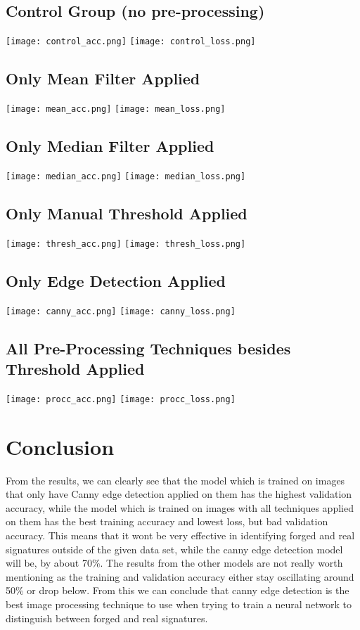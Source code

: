 \documentclass[conference]{IEEEtran}
\begin{document}
\subsection{Control Group (no pre-processing)}

\texttt{[image: control\_acc.png]}
\texttt{[image: control\_loss.png]}
\newpage

\subsection{Only Mean Filter Applied}
\texttt{[image: mean\_acc.png]}
\texttt{[image: mean\_loss.png]}

\subsection{Only Median Filter Applied}
\texttt{[image: median\_acc.png]}
\texttt{[image: median\_loss.png]}

\subsection{Only Manual Threshold Applied}
\texttt{[image: thresh\_acc.png]}
\texttt{[image: thresh\_loss.png]}

\subsection{Only Edge Detection Applied}
\texttt{[image: canny\_acc.png]}
\texttt{[image: canny\_loss.png]}

\subsection{All Pre-Processing Techniques besides Threshold Applied}
\texttt{[image: procc\_acc.png]}
\texttt{[image: procc\_loss.png]}



\section{Conclusion}
From the results, we can clearly see that the model which is trained on images that only have Canny edge detection applied on them has the highest validation accuracy, while the model which is trained on images with all techniques applied on them has the best training accuracy and lowest loss, but bad validation accuracy. This means that it wont be very effective in identifying forged and real signatures outside of the given data set, while the canny edge detection model will be, by about 70\%. The results from the other models are not really worth mentioning as the training and validation accuracy either stay oscillating around 50\% or drop below. From this we can conclude that canny edge detection is the best image processing technique to use when trying to train a neural network to distinguish between forged and real signatures.
\end{document}
